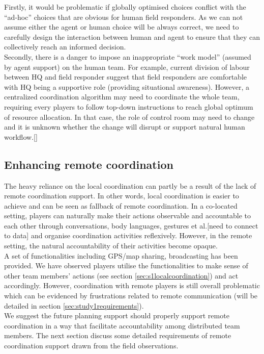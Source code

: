Firstly, it would be problematic if globally optimised choices conflict with the ``ad-hoc'' choices that are obvious for human field responders. As we can not assume either the agent or human choice will be always correct, we need to carefully design the interaction between human and agent to ensure that they can collectively reach an informed decision.\\

Secondly, there is a danger to impose an inappropriate ``work model'' (assumed by agent support) on the human team. For example, current division of labour between HQ and field responder suggest that field responders are comfortable with HQ being a supportive role (providing situational awareness). However, a centralized coordination algorithm may need to coordinate the whole team, requiring every players to follow top-down instructions to reach global optimum of resource allocation. In that case, the role of control room may need to change and it is unknown whether the change will disrupt or support natural human workflow.[] \\

\subsection{Enhancing remote coordination}
The heavy reliance on the local coordination can partly be a result of the lack of remote coordination support. In other words, local coordination is easier to achieve and can be seen as fallback of remote coordination. In a co-located setting, players can naturally make their actions observable and accountable to each other through conversations, body languages, gestures et al.[need to connect to data]  and organise coordination activities reflexively. However, in the remote setting, the natural accountability of their activities become opaque.\\

A set of functionalities including GPS/map sharing, broadcasting has been provided. We have observed players utilise the functionalities to make sense of other team members' actions (see section \ref{sec:s1localcoordination}) and act accordingly. However, coordination with remote players is still overall problematic which can be evidenced by frustrations related to remote communication (will be detailed in section \ref{sec:study1requirements}).\\

We suggest the future planning support should properly support remote coordination in a way that facilitate accountability among distributed team members. The next section discuss some detailed requirements of remote coordination support drawn from the field observations. \\

